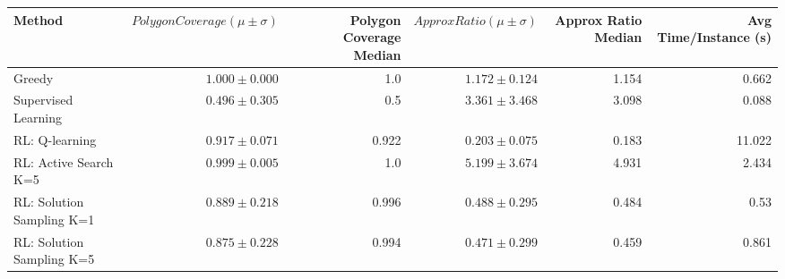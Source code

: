 \begin{tabular}{lrrrrr}
    \toprule
Method & $Polygon Coverage (\mu\pm\sigma)$ & Polygon Coverage Median & $Approx Ratio (\mu\pm\sigma)$ & Approx Ratio Median & Avg Time/Instance (s) \\
    \midrule
Greedy & $1.000 \pm 0.000$ & 1.0 & $1.172 \pm 0.124$ & 1.154 & 0.662 \\
Supervised Learning & $0.496 \pm 0.305$ & 0.5 & $3.361 \pm 3.468$ & 3.098 & 0.088 \\
RL: Q-learning & $0.917 \pm 0.071$ & 0.922 & $0.203 \pm 0.075$ & 0.183 & 11.022 \\
RL: Active Search K=5 & $0.999 \pm 0.005$ & 1.0 & $5.199 \pm 3.674$ & 4.931 & 2.434 \\
RL: Solution Sampling K=1 & $0.889 \pm 0.218$ & 0.996 & $0.488 \pm 0.295$ & 0.484 & 0.53 \\
RL: Solution Sampling K=5 & $0.875 \pm 0.228$ & 0.994 & $0.471 \pm 0.299$ & 0.459 & 0.861 \\
    \bottomrule
\end{tabular}
